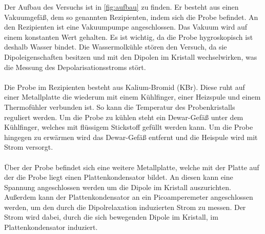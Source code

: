 Der Aufbau des Versuchs ist in \autoref{fig:aufbau} zu finden.
Er besteht aus einen Vakuumgefäß, dem so genannten Rezipienten, indem sich die Probe befindet.
An den Rezipienten ist eine Vakuumpumpe angeschlossen.
Das Vakuum wird auf einem konstanten Wert gehalten.
Es ist wichtig, da die Probe hygroskopisch ist deshalb Wasser bindet.
Die Wassermolkühle stören den Versuch, da sie Dipoleigenschaften besitzen und mit den Dipolen im Kristall wechselwirken, was die Messung des Depolarisationsstroms stört.
\\\\
Die Probe im Rezipienten besteht aus Kalium-Bromid (KBr).
Diese ruht auf einer Metallplatte die wiederum mit einem Kühlfinger, einer Heizspule und einem Thermofühler verbunden ist.
So kann die Temperatur des Probenkristalls reguliert werden.
Um die Probe zu kühlen steht ein Dewar-Gefäß unter dem Kühlfinger, welches mit flüssigem Stickstoff gefüllt werden kann.
Um die Probe hingegen zu erwärmen wird das Dewar-Gefäß entfernt und die Heispule wird mit Strom versorgt.
\\\\
Über der Probe befindet sich eine weitere Metallplatte, welche mit der Platte auf der die Probe liegt einen Plattenkondensator bildet.
An diesen kann eine Spannung angeschlossen werden um die Dipole im Kristall auszurichten.
Außerdem kann der Plattenkondensator an ein Picoamperemeter angeschlossen werden, um den durch die Dipolrelaxation induzierten Strom zu messen.
Der Strom wird dabei, durch die sich bewegenden Dipole im Kristall, im Plattenkondensator induziert.

